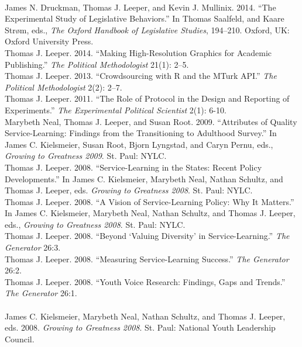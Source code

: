\documentclass[12pt]{article}
\newcommand{\topic}[1]{\pagebreak[3]\indent {\color{lg}{\footnotesize #1 }}\\}
\newcommand{\entry}[1]{\indent {\color{lg}\guillemotright}\hspace{2pt}#1\vspace{.25em}\\}
\begin{document}
\topic{Other Publications}
\entry{James N. Druckman, Thomas J. Leeper, and Kevin J. Mullinix. 2014. ``The Experimental Study of Legislative Behaviors.'' In Thomas Saalfeld, and Kaare Str\o m, eds., {\em The Oxford Handbook of Legislative Studies}, 194--210. Oxford, UK: Oxford University Press.}
\entry{Thomas J. Leeper. 2014. ``Making High-Resolution Graphics for Academic Publishing.'' {\em The Political Methodologist} 21(1): 2--5.}
\entry{Thomas J. Leeper. 2013. ``Crowdsourcing with R and the MTurk API.'' {\em The Political Methodologist} 2(2): 2--7.}
\entry{Thomas J. Leeper. 2011. ``The Role of Protocol in the Design and Reporting of Experiments.'' {\em The Experimental Political Scientist} 2(1): 6-10.}%
\entry{Marybeth Neal, Thomas J. Leeper, and Susan Root. 2009. ``Attributes of Quality Service-Learning: Findings from the Transitioning to Adulthood Survey.'' In James C. Kielsmeier, Susan Root, Bjorn Lyngstad, and Caryn Pernu, eds., {\em Growing to Greatness 2009}. St. Paul: NYLC.}
\entry{Thomas J. Leeper. 2008. ``Service-Learning in the States: Recent Policy Developments.'' In James C. Kielsmeier, Marybeth Neal, Nathan Schultz, and Thomas J. Leeper, eds. {\em Growing to Greatness 2008}. St. Paul: NYLC.}
\entry{Thomas J. Leeper. 2008. ``A Vision of Service-Learning Policy: Why It Matters.'' In James C. Kielsmeier, Marybeth Neal, Nathan Schultz, and Thomas J. Leeper, eds., {\em Growing to Greatness 2008}. St. Paul: NYLC.}
\entry{Thomas J. Leeper. 2008. ``Beyond `Valuing Diversity' in Service-Learning.'' {\em The Generator} 26:3.}
\entry{Thomas J. Leeper. 2008. ``Measuring Service-Learning Success.'' {\em The Generator} 26:2.}
\entry{Thomas J. Leeper. 2008. ``Youth Voice Research: Findings, Gaps and Trends.'' {\em The Generator} 26:1.}

\topic{Edited Volume}
\entry{James C. Kielsmeier, Marybeth Neal, Nathan Schultz, and Thomas J. Leeper, eds. 2008. {\em Growing to Greatness 2008}. St. Paul: National Youth Leadership Council.}
\end{document}
